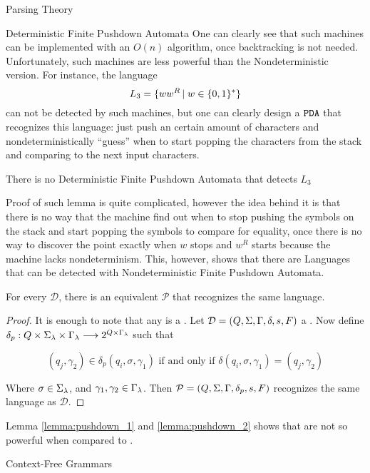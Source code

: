 \begin{section}{Parsing Theory}
\begin{subsection}{Deterministic Finite Pushdown Automata}
One can clearly see that such machines can be implemented with an $O(n)$ algorithm,
once backtracking is not needed. Unfortunately, such machines are less powerful
than the Nondeterministic version. For instance, the language
$$L_3 = \{ww^R\,|\;w \in \{0, 1\}^*\}$$
can not be detected by such machines, but one can clearly design a $\texttt{PDA}$
that recognizes this language: just push an certain amount of characters
and nondeterministically ``guess'' when to start popping the characters
from the stack and comparing to the next input characters.

\begin{lemma}\label{lemma:pushdown_1}
	There is no Deterministic Finite Pushdown Automata that detects $L_3$
\end{lemma}
Proof of such lemma is quite complicated, however the idea behind it is that
there is no way that the machine find out when to stop pushing the symbols
on the stack and start popping the symbols to compare for equality, once
there is no way to discover the point exactly when $w$ stops and $w^R$ starts
because the machine lacks nondeterminism. This, however, shows that there
are Languages that can be detected with Nondeterministic Finite Pushdown
Automata.

\begin{lemma}\label{lemma:pushdown_2}
	For every  $\mathcal{D}$, there is
	an equivalent  $\mathcal{P}$ that recognizes the
	same language.
\end{lemma}
\begin{proof}
	 It is enough to note that any  is a .  Let $\mathcal{D}
	 = (Q, \Sigma, \Gamma, \delta, s, F)$ a \DPDA. Now define
	 $\delta_p : Q\times\Sigma_\lambda\times\Gamma_\lambda \longrightarrow 2^{Q\times\Gamma_\lambda}$ such that

	 $$ (q_j, \gamma_2) \in
	 \delta_p(q_i, \sigma, \gamma_1) \text{ if and only if } \delta(q_i,
	 \sigma, \gamma_1) = (q_j, \gamma_2)$$

	 Where $\sigma \in \Sigma_\lambda$, and
	 $\gamma_1, \gamma_2 \in \Gamma_\lambda$. Then $\mathcal{P} = (Q, \Sigma, \Gamma,
	 \delta_p, s, F)$ recognizes the same language as $\mathcal{D}$.
\end{proof}

Lemma \ref{lemma:pushdown_1} and \ref{lemma:pushdown_2} shows that  are not
so powerful when compared to .

\end{subsection}

\begin{subsection}{Context-Free Grammars}\label{cfg}


\end{subsection}
\end{section}
